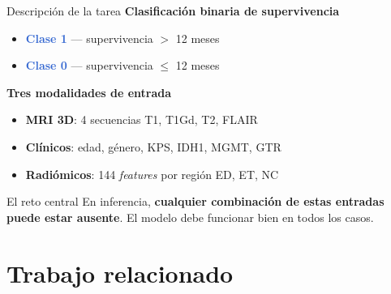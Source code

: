 \documentclass[aspectratio=169]{beamer}
\newcommand{\hl}[1]{\textcolor{highlight}{\textbf{#1}}}
\begin{document}
\begin{frame}{Descripción de la tarea}
      \textbf{Clasificación binaria de supervivencia}
      \begin{itemize}
        \item \hl{Clase 1} --- supervivencia $>$ 12 meses
        \item \hl{Clase 0} --- supervivencia $\leq$ 12 meses
      \end{itemize}

      \medskip
      \textbf{Tres modalidades de entrada}
      \begin{itemize}
        \item \textbf{MRI 3D}: 4 secuencias T1, T1Gd, T2, FLAIR
        \item \textbf{Clínicos}: edad, género, KPS, IDH1, MGMT, GTR
        \item \textbf{Radiómicos}: 144 \textit{features} por región ED, ET, NC
      \end{itemize}

      \medskip
      \begin{block}{El reto central}
        \small En inferencia, \textbf{cualquier combinación de estas entradas puede estar ausente}. El modelo debe funcionar bien en todos los casos.
      \end{block}
\end{frame}

\section{Trabajo relacionado}
\end{document}
